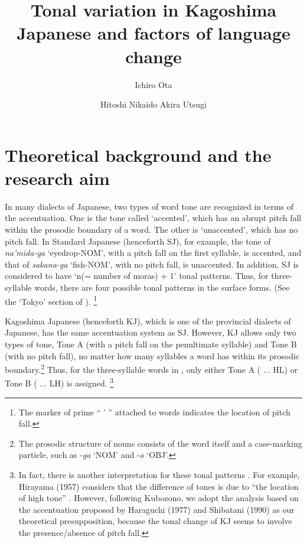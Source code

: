 \documentclass[output=paper]{LSP/langsci}
\author{Ichiro Ota\affiliation{Kagoshima University}\and Hitoshi Nikaido\affiliation{Fukuoka Jo Gakuin University} \lastand Akira Utsugi\affiliation{Nagoya University}}
\title{Tonal variation in {K}agoshima {J}apanese and factors of language change}
\begin{document}
 

\section{Theoretical background and the research aim}
     In many dialects of Japanese, two types of word tone are recognized in terms of the accentuation. One is the tone called `accented', which has an abrupt pitch fall within the prosodic boundary of a word. The other is `unaccented', which has no pitch fall. In Standard Japanese (henceforth SJ), for example, the tone of \textit{na'mida-ga} `eyedrop-NOM', with a pitch fall on the first syllable, is accented, and that of \textit{sakana-ga} `fish-NOM', with no pitch fall, is unaccented. In addition, SJ is considered to have `n(= number of moras) + 1' tonal patterns. Thus, for three-syllable words, there are four possible tonal patterns in the surface forms. (See the `Tokyo' section of ). \footnote{ The marker of prime “ ’ ” attached to words indicates the location of pitch fall.}

     Kagoshima Japanese (henceforth KJ), which is one of the provincial dialects of Japanese, has the same accentuation system as SJ. However, KJ allows only two types of tone, Tone A (with a pitch fall on the penultimate syllable) and Tone B (with no pitch fall), no matter how many syllables a word has within its prosodic boundary.\footnote{ The prosodic structure of nouns consists of the word itself and a case-marking particle, such as -\textit{ga} `NOM' and -\textit{o} `OBJ'.} Thus, for the three-syllable words in , only either Tone A ( ... HL) or Tone B ( ... LH) is assigned. \footnote{ In fact, there is another interpretation for these tonal patterns \citep{kubozono_tonal_2007}. For example, Hirayama (1957) %
considers that the difference of tones is due to ``the location of high tone'' \citep[327]{kubozono_tonal_2007}. However, following Kubozono, we adopt the analysis based on the accentuation proposed by Haraguchi (1977) and Shibatani (1990) %
as our theoretical presupposition, because the tonal change of KJ seems to involve the presence/absence of pitch fall.  
} 
 
\end{document}
